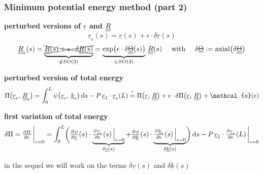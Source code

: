 \begin{frame}
  \frametitle{Minimum potential energy method (part 2)}
  
  \textbf{perturbed versions of $\underline{r}$ and $\underline{\underline{R}}$}
  \begin{displaymath}
    \underline{r}_{\epsilon}(s) = \underline{r}(s) + \epsilon \cdot \delta \underline{r}(s)
  \end{displaymath}
  \vspace{-0.5em}
  \begin{displaymath}
    \underline{\underline{R}}_{\epsilon}(s) = \underbrace{\xcancel{\underline{\underline{R}}(s) + \epsilon \cdot \delta \underline{\underline{R}}(s)}}_{\notin SO(3)} = \underbrace{\exp \bigl( \epsilon \cdot \delta \underline{\underline{\Theta}}(s) \bigr)}_{\in SO(3)} \, \underline{\underline{R}}(s)
    \quad \text{ with } \quad
    \delta \underline{\Theta} := \mathrm{axial} \bigl( \delta \underline{\underline{\Theta}} \bigr)
  \end{displaymath}
  
  \vspace{0.6em}
  \textbf{perturbed version of total energy}
  \begin{displaymath}
    \Pi \bigl( \underline{r}_{\epsilon}, \, \doubleunderline{R}_{\epsilon} \bigr) =
    \int_0^L \psi \bigl( \underline{v}_{\epsilon} , \, \underline{k}_{\epsilon} \bigr) \dif s - P \, \underline{e}_1 \cdot \underline{r}_{\epsilon}(L) \overset{!}{=}
    \Pi \bigl( \underline{r}, \, \doubleunderline{R} \bigr) + \epsilon \cdot \delta \Pi \bigl( \underline{r}, \, \doubleunderline{R} \bigr) + \mathcal{o}(\epsilon)
  \end{displaymath}
  
  \vspace{0.6em}
  \textbf{first variation of total energy}
  \begin{displaymath}
    \delta \Pi = \pd{\Pi}{\epsilon} \sVert[3]_{\epsilon=0} =
    \int_0^L \biggl(
    \pd{\psi}{\underline{v}}(s) \cdot \underbrace{ \pd{\underline{v}_{\epsilon}}{\epsilon}(s) \sVert[2]_{\epsilon=0} }_{\delta \underline{v}(s)} +
    \pd{\psi}{\underline{k}}(s) \cdot \underbrace{ \pd{\underline{k}_{\epsilon}}{\epsilon}(s)\sVert[2]_{\epsilon=0} }_{\delta \underline{k}(s)}
    \biggr) \dif s
    - P \, \underline{e}_1 \cdot \pd{\underline{r}_{\epsilon}}{\epsilon}(L) \sVert[3]_{\epsilon=0}
  \end{displaymath}
  
  in the sequel we will work on the terms $\delta \underline{v}(s)$ and $\delta \underline{k}(s)$
\end{frame}


